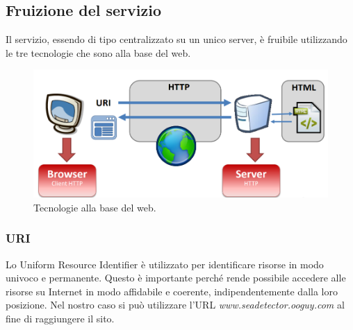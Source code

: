 \documentclass[a4paper,final,12pt]{report}
\begin{document}
\subsection{Fruizione del servizio}
Il servizio, essendo di tipo centralizzato su un unico server, è fruibile utilizzando le tre tecnologie che sono alla base del web.
\begin{figure}[hbtp]
\centering
\includegraphics[scale=0.60]{img_concettuale/tecnologie.png}
\caption{Tecnologie alla base del web.}
\end{figure} 

\subsubsection{URI}
Lo Uniform Resource Identifier è utilizzato per identificare risorse in modo univoco e permanente. Questo è importante perché rende possibile accedere alle risorse su Internet in modo affidabile e coerente, indipendentemente dalla loro posizione. Nel nostro caso si può utilizzare l'URL \textit{www.seadetector.ooguy.com} al fine di raggiungere il sito.
\end{document}
